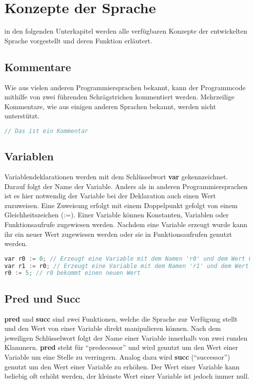 \section{Konzepte der Sprache} \label{sec:while-konzepte}
in den folgenden Unterkapitel werden alle verfügbaren Konzepte der entwickelten Sprache vorgestellt und deren Funktion erläutert.

\subsection{Kommentare}
Wie aus vielen anderen Programmiersprachen bekannt, kann der Programmcode mithilfe von zwei führenden Schrägstrichen  kommentiert werden. Mehrzeilige Kommentare, wie aus einigen anderen Sprachen bekannt, werden nicht unterstützt.

\begin{lstlisting}[language=c, caption=Kommentare in While, label={lst:while-comment}]
	// Das ist ein Kommentar
\end{lstlisting}

\subsection{Variablen}
Variablendeklarationen werden mit dem Schlüsselwort \textbf{var} gekennzeichnet. Darauf folgt der Name der Variable. Anders als in anderen Programmiersprachen ist es hier notwendig der Variable bei der Deklaration auch einen Wert zuzuweisen. Eine Zuweisung erfolgt mit einem Doppelpunkt gefolgt von einem Gleichheitszeichen (:=). Einer Variable können Konstanten, Variablen oder Funktionsaufrufe zugewiesen werden. Nachdem eine Variable erzeugt wurde kann ihr ein neuer Wert zugewiesen werden oder sie in Funktionsaufrufen genutzt werden.

\begin{lstlisting}[language=c, caption=Variablennutzung in While, label={lst:while-var-defdec}]
var r0 := 0; // Erzeugt eine Variable mit dem Namen 'r0' und dem Wert 0
var r1 := r0; // Erzeugt eine Variable mit dem Namen 'r1' und dem Wert von r0
r0 := 5; // r0 bekommt einen neuen Wert
\end{lstlisting}

\subsection{Pred und Succ} \label{subsec:while-konzepte-pred}
\textbf{pred} und \textbf{succ} sind zwei Funktionen, welche die Sprache zur Verfügung stellt und den Wert von einer Variable direkt manipulieren können. Nach dem jeweiligen Schlüsselwort folgt der Name einer Variable innerhalb von zwei runden Klammern. \textbf{pred} steht für \enquote{predecessor} und wird genutzt um den Wert einer Variable um eine Stelle zu verringern. Analog dazu wird \textbf{succ} (\enquote{successor}) genutzt um den Wert einer Variable zu erhöhen. Der Wert einer Variable kann beliebig oft erhöht werden, der kleinste Wert einer Variable ist jedoch immer null.

